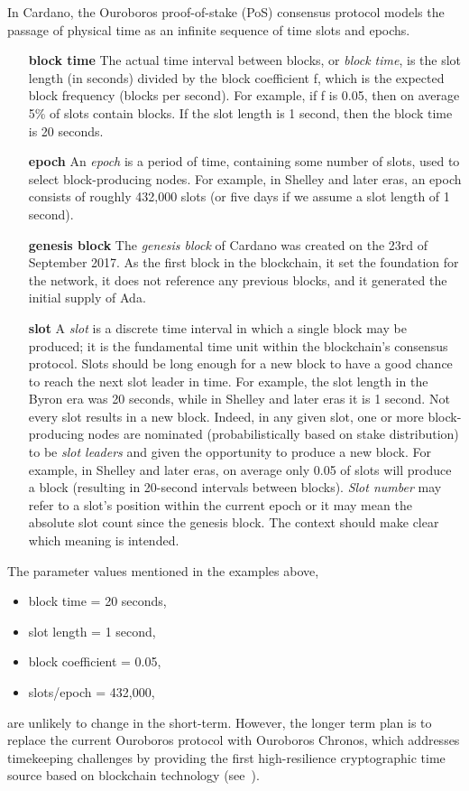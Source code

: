 In Cardano, the Ouroboros proof-of-stake (PoS) consensus protocol models the passage
of physical time as an infinite sequence of time slots and epochs.

\begin{itemize}
\item[\textbf{block time}]
  The actual time interval between blocks, or \emph{block time}, is the slot length
  (in seconds) divided by the block coefficient f, which is the expected block
  frequency (blocks per second).
  For example, if f is 0.05, then on average 5\% of slots contain blocks.
  If the slot length is 1 second, then the block time is 20 seconds.

\item[\textbf{epoch}]
  An \emph{epoch} is a period of time, containing some number of slots, used to select
  block-producing nodes.
  For example, in Shelley and later eras, an epoch consists of roughly 432,000 slots (or five
  days if we assume a slot length of 1 second).

\item[\textbf{genesis block}]
  The \emph{genesis block} of Cardano was created on the 23rd of September 2017. As the
  first block in the blockchain, it set the foundation for the network, it does not
  reference any previous blocks, and it generated the initial supply of Ada.

\item[\textbf{slot}]
  A \emph{slot} is a discrete time interval in which a single block may be produced; it
  is the fundamental time unit within the blockchain's consensus protocol.
  Slots should be long enough for a new block to have a good chance to reach the next
  slot leader in time.  For example, the slot length in the Byron era was 20
  seconds, while in Shelley and later eras it is 1 second.
  Not every slot results in a new block.  Indeed, in any given slot, one or more
  block-producing nodes are nominated (probabilistically based on stake distribution)
  to be \textit{slot leaders} and given the opportunity to produce a new block.
  For example, in Shelley and later eras, on average only 0.05 of slots will produce a
  block (resulting in 20-second intervals between blocks).
  \emph{Slot number} may refer to a slot's position within the current epoch or it
  may mean the absolute slot count since the genesis block.  The context should make
  clear which meaning is intended.
\end{itemize}

The parameter values mentioned in the examples above,
\begin{itemize}[noitemsep]
  \item block time = 20 seconds,
  \item slot length = 1 second,
  \item block coefficient = 0.05,
  \item slots/epoch = 432,000,
\end{itemize}
are unlikely to change in the short-term.  However, the longer term plan is to
replace the current Ouroboros  protocol with Ouroboros Chronos, which addresses
timekeeping challenges by providing the first high-resilience cryptographic time
source based on blockchain technology (see~\textcite{www-iohk-blog-ouroboros}).
